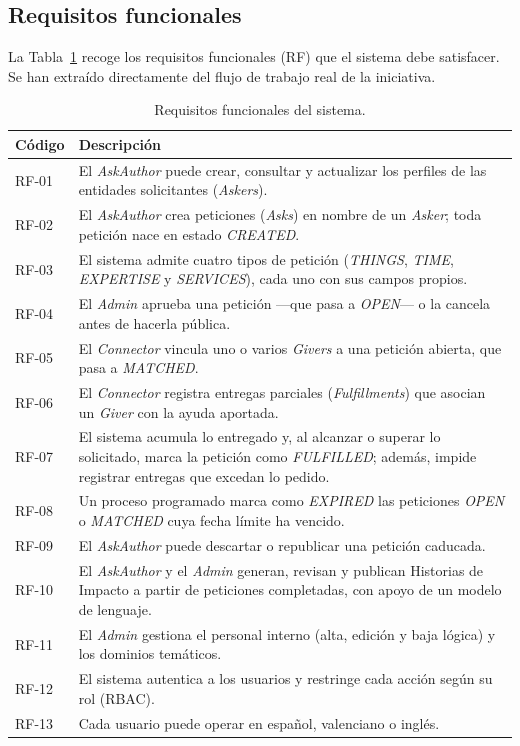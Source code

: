 \documentclass[11pt,oneside,spanish,listoffigures,listoftables]{tfgetsinf}
\begin{document}
\subsection{Requisitos funcionales}

La Tabla~\ref{tab:requisitos-funcionales} recoge los requisitos funcionales (RF) que el sistema debe satisfacer. Se han extraído directamente del flujo de trabajo real de la iniciativa.

\begin{table}[ht]
\centering
\caption[Requisitos funcionales del sistema]{Requisitos funcionales del sistema.}
\label{tab:requisitos-funcionales}
\footnotesize
\renewcommand{\arraystretch}{1.3}
\begin{tabularx}{\textwidth}{%
  >{\raggedright\arraybackslash}p{1.4cm}%
  >{\raggedright\arraybackslash}X}
\toprule
\textbf{Código} & \textbf{Descripción} \\
\midrule
RF-01 & El \textit{AskAuthor} puede crear, consultar y actualizar los perfiles de las entidades solicitantes (\textit{Askers}). \\
RF-02 & El \textit{AskAuthor} crea peticiones (\textit{Asks}) en nombre de un \textit{Asker}; toda petición nace en estado \textit{CREATED}. \\
RF-03 & El sistema admite cuatro tipos de petición (\textit{THINGS}, \textit{TIME}, \textit{EXPERTISE} y \textit{SERVICES}), cada uno con sus campos propios. \\
RF-04 & El \textit{Admin} aprueba una petición —que pasa a \textit{OPEN}— o la cancela antes de hacerla pública. \\
RF-05 & El \textit{Connector} vincula uno o varios \textit{Givers} a una petición abierta, que pasa a \textit{MATCHED}. \\
RF-06 & El \textit{Connector} registra entregas parciales (\textit{Fulfillments}) que asocian un \textit{Giver} con la ayuda aportada. \\
RF-07 & El sistema acumula lo entregado y, al alcanzar o superar lo solicitado, marca la petición como \textit{FULFILLED}; además, impide registrar entregas que excedan lo pedido. \\
RF-08 & Un proceso programado marca como \textit{EXPIRED} las peticiones \textit{OPEN} o \textit{MATCHED} cuya fecha límite ha vencido. \\
RF-09 & El \textit{AskAuthor} puede descartar o republicar una petición caducada. \\
RF-10 & El \textit{AskAuthor} y el \textit{Admin} generan, revisan y publican Historias de Impacto a partir de peticiones completadas, con apoyo de un modelo de lenguaje. \\
RF-11 & El \textit{Admin} gestiona el personal interno (alta, edición y baja lógica) y los dominios temáticos. \\
RF-12 & El sistema autentica a los usuarios y restringe cada acción según su rol (RBAC). \\
RF-13 & Cada usuario puede operar en español, valenciano o inglés. \\
\bottomrule
\end{tabularx}
\end{table}
\end{document}
